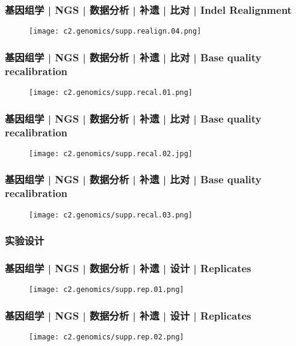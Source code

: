 \begin{frame}
  \frametitle{基因组学 | NGS | 数据分析 | 补遗 | 比对 | Indel Realignment}
  \begin{figure}
    \centering
    \texttt{[image: c2.genomics/supp.realign.04.png]}
  \end{figure}
\end{frame}

\begin{frame}
  \frametitle{基因组学 | NGS | 数据分析 | 补遗 | 比对 | Base quality recalibration}
  \begin{figure}
    \centering
    \texttt{[image: c2.genomics/supp.recal.01.png]}
  \end{figure}
\end{frame}

\begin{frame}
  \frametitle{基因组学 | NGS | 数据分析 | 补遗 | 比对 | Base quality recalibration}
  \begin{figure}
    \centering
    \texttt{[image: c2.genomics/supp.recal.02.jpg]}
  \end{figure}
\end{frame}

\begin{frame}
  \frametitle{基因组学 | NGS | 数据分析 | 补遗 | 比对 | Base quality recalibration}
  \begin{figure}
    \centering
    \texttt{[image: c2.genomics/supp.recal.03.png]}
  \end{figure}
\end{frame}

\subsubsection{实验设计}
\begin{frame}
  \frametitle{基因组学 | NGS | 数据分析 | 补遗 | 设计 | Replicates}
  \begin{figure}
    \centering
    \texttt{[image: c2.genomics/supp.rep.01.png]}
  \end{figure}
\end{frame}

\begin{frame}
  \frametitle{基因组学 | NGS | 数据分析 | 补遗 | 设计 | Replicates}
  \begin{figure}
    \centering
    \texttt{[image: c2.genomics/supp.rep.02.png]}
  \end{figure}
\end{frame}

